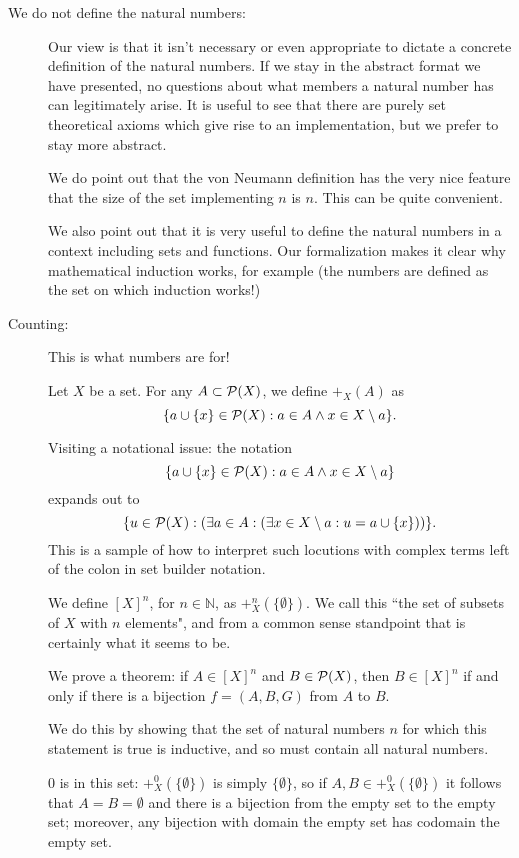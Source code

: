 \documentclass[12pt]{article}
\begin{document}
\begin{description}
\item[We do not define the natural numbers:]  Our view is that it isn't necessary or even appropriate to dictate a concrete definition of the natural numbers.  If we stay in the abstract format we have presented, no questions about what members a natural number has can legitimately arise.  It is useful to see that there are purely set theoretical axioms which give rise to an implementation, but we prefer to stay more abstract.

We do point out that the von Neumann definition has the very nice feature that the size of the set implementing $n$ is $n$.  This can be quite convenient.

We also point out that it is very useful to define the natural numbers in a context including sets and functions.  Our formalization makes it clear why mathematical induction works, for example (the numbers are defined as the set on which induction works!)

\item[Counting:]  This is what numbers are for!

Let $X$ be a set.  For any $A \subset {\cal P}(X)$, we define $+_X(A)$ as $$\{a \cup \{x\} \in {\cal P}(X):  a \in A \wedge x \in X\setminus a\}.$$

Visiting a notational issue:  the notation $$\{a \cup \{x\}\in {\cal P}(X):  a \in A \wedge x \in X\setminus a\}$$ expands out to
$$\{u \in {\cal P}(X):(\exists a \in A:(\exists x \in X\setminus a:u = a \cup \{x\}))\}.$$   This is a sample of how to interpret such locutions with complex terms left of the colon in set builder notation.

We define $[X]^n$, for $n \in {\mathbb N}$, as $+_X^n(\{\emptyset\})$.  We call this ``the set of subsets of $X$ with $n$ elements", and from a common sense standpoint that is certainly what it seems to be.

We prove a theorem:  if $A \in [X]^n$ and $B \in {\cal P}(X)$, then $B \in [X]^n$ if and only if there is a bijection $f=(A,B,G)$ from $A$ to $B$.

We do this by showing that the set of natural numbers $n$ for which this statement is true is inductive, and so must contain all natural numbers.

0 is in this set:  $+_X^0(\{\emptyset\})$ is simply $\{\emptyset\}$, so if $A,B \in +_X^0(\{\emptyset\})$ it follows
that $A=B=\emptyset$ and there is a bijection from the empty set to the empty set;  moreover, any bijection with domain the empty set has codomain the empty set.


\end{description}
\end{document}
